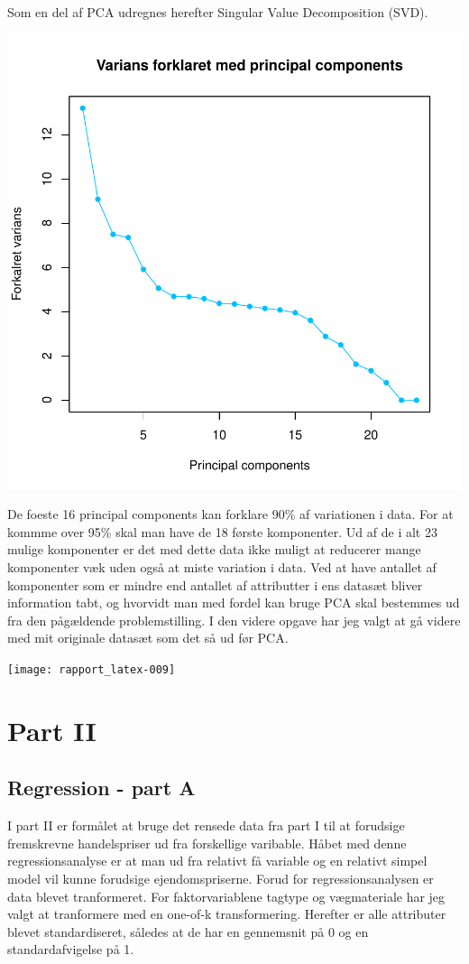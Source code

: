 \documentclass{report}
\begin{document}
Som en del af PCA udregnes herefter Singular Value Decomposition (SVD).

\includegraphics{rapport_latex-008}

De foeste 16 principal components kan forklare 90\% af variationen i data. For at kommme over 95\% skal man have de 18 første komponenter. Ud af de i alt 23 mulige komponenter er det med dette data ikke muligt at reducerer mange komponenter væk uden også at miste variation i data. 
Ved at have antallet af komponenter som er mindre end antallet af attributter i ens datasæt bliver information tabt, og hvorvidt man med fordel kan bruge PCA skal bestemmes ud fra den pågældende problemstilling. I den videre opgave har jeg valgt at gå videre med mit originale datasæt som det så ud før PCA. 

\texttt{[image: rapport\_latex-009]}


\chapter{Part II}

\section{Regression - part A}
I part II er formålet at bruge det rensede data fra part I til at forudsige fremskrevne handelspriser ud fra forskellige varibable. 
Håbet med denne regressionsanalyse er at man ud fra relativt få variable og en relativt simpel model vil kunne forudsige ejendomspriserne. 
Forud for regressionsanalysen er data blevet tranformeret. For faktorvariablene tagtype og vægmateriale har jeg valgt at tranformere med en one-of-k transformering. Herefter er alle attributer blevet standardiseret, således at de har en gennemsnit på 0 og en standardafvigelse på 1. 
\end{document}
